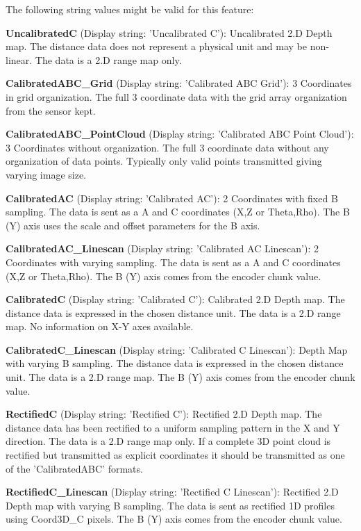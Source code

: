 The following string values might be valid for this feature\+:
\begin{DoxyItemize}
\item {\bfseries Uncalibrated\+C} (Display string\+: 'Uncalibrated C')\+: Uncalibrated 2.\+D Depth map. The distance data does not represent a physical unit and may be non-\/linear. The data is a 2.\+D range map only.
\item {\bfseries Calibrated\+A\+B\+C\+\_\+\+Grid} (Display string\+: 'Calibrated A\+B\+C Grid')\+: 3 Coordinates in grid organization. The full 3 coordinate data with the grid array organization from the sensor kept.
\item {\bfseries Calibrated\+A\+B\+C\+\_\+\+Point\+Cloud} (Display string\+: 'Calibrated A\+B\+C Point Cloud')\+: 3 Coordinates without organization. The full 3 coordinate data without any organization of data points. Typically only valid points transmitted giving varying image size.
\item {\bfseries Calibrated\+A\+C} (Display string\+: 'Calibrated A\+C')\+: 2 Coordinates with fixed B sampling. The data is sent as a A and C coordinates (X,Z or Theta,Rho). The B (Y) axis uses the scale and offset parameters for the B axis.
\item {\bfseries Calibrated\+A\+C\+\_\+\+Linescan} (Display string\+: 'Calibrated A\+C Linescan')\+: 2 Coordinates with varying sampling. The data is sent as a A and C coordinates (X,Z or Theta,Rho). The B (Y) axis comes from the encoder chunk value.
\item {\bfseries Calibrated\+C} (Display string\+: 'Calibrated C')\+: Calibrated 2.\+D Depth map. The distance data is expressed in the chosen distance unit. The data is a 2.\+D range map. No information on X-\/\+Y axes available.
\item {\bfseries Calibrated\+C\+\_\+\+Linescan} (Display string\+: 'Calibrated C Linescan')\+: Depth Map with varying B sampling. The distance data is expressed in the chosen distance unit. The data is a 2.\+D range map. The B (Y) axis comes from the encoder chunk value.
\item {\bfseries Rectified\+C} (Display string\+: 'Rectified C')\+: Rectified 2.\+D Depth map. The distance data has been rectified to a uniform sampling pattern in the X and Y direction. The data is a 2.\+D range map only. If a complete 3\+D point cloud is rectified but transmitted as explicit coordinates it should be transmitted as one of the 'Calibrated\+A\+B\+C' formats.
\item {\bfseries Rectified\+C\+\_\+\+Linescan} (Display string\+: 'Rectified C Linescan')\+: Rectified 2.\+D Depth map with varying B sampling. The data is sent as rectified 1\+D profiles using Coord3\+D\+\_\+\+C pixels. The B (Y) axis comes from the encoder chunk value.

\end{DoxyItemize}
